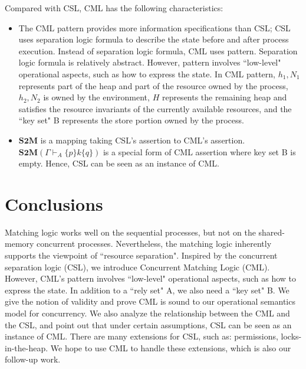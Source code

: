 \documentclass{lmcs} %
\theoremstyle{plain}\newtheorem{satz}[thm]{Satz} %
\begin{document}
Compared with CSL, CML has the following characteristics:
\begin{itemize}
  \item The CML pattern provides more information specifications than CSL; CSL uses separation logic formula to describe the state before and after process execution. Instead of separation logic formula, CML uses pattern. Separation logic formula is relatively abstract. However, pattern involves ``low-level" operational aspects, such as how to express the state. In CML pattern, $h_1,N_1$ represents part of the heap and part of the resource owned by the process, $h_2,N_2$ is owned by the environment, $H$ represents the remaining heap and satisfies the resource invariants of the currently available resources, and the ``key set" B represents the store portion owned by the process.
  \item $\mathbf{S2M}$ is a mapping taking CSL's assertion to CML's assertion. $\mathbf{S2M}(\Gamma \vdash_{A}\{p\}k\{q\})$ is a special form of CML assertion where key set B is empty. Hence, CSL can be seen as an instance of CML.
\end{itemize}
\section{Conclusions}
Matching logic works well on the sequential processes, but not on the shared-memory concurrent processes. Nevertheless, the matching logic inherently supports the viewpoint of ``resource separation". Inspired by the concurrent separation logic (CSL), we introduce Concurrent Matching Logic (CML). However, CML's pattern involves ``low-level" operational
aspects, such as how to express the state. In addition to a ``rely set" A, we also need a ``key set" B. We give the notion
of validity and prove CML is sound to our operational semantics model for concurrency. We also analyze the relationship between the CML and the CSL, and point out that under certain assumptions, CSL can be seen as an instance of CML.
There are many extensions for CSL, such as: permissions\cite{boyland2003checking}\cite{bornat2005permission}, locks-in-the-heap\cite{gotsman2007local}\cite{hobor2008oracle}. We hope to use CML to handle these extensions, which is also our follow-up work.


\appendix
\end{document}
